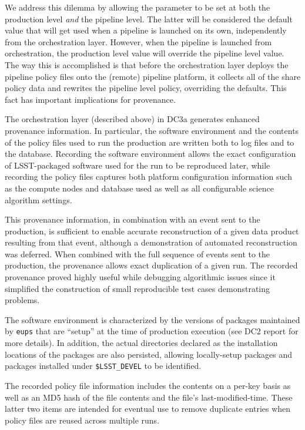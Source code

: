 We address this dilemma by allowing the parameter to be set at both
the production level {\it and} the pipeline level.  The latter will be
considered the default value that will get used when a pipeline is
launched on its own, independently from the orchestration layer.
However, when the pipeline is launched from orchestration, the
production level value will override the pipeline level value.  The
way this is accomplished is that before the orchestration layer
deploys the pipeline policy files onto the (remote) pipeline platform,
it collects all of the share policy data and rewrites the pipeline
level policy, overriding the defaults.  This fact has important
implications for provenance.  



The orchestration layer (described above) in DC3a generates enhanced
provenance information.  In particular, the software environment and
the contents of the policy files used to run the production are
written both to log files and to the database.  Recording the software
environment allows the exact configuration of LSST-packaged software
used for the run to be reproduced later, while recording the policy
files captures both platform configuration information such as the
compute nodes and database used as well as all configurable science
algorithm settings.

This provenance information, in combination with an event sent to the
production, is sufficient to enable accurate reconstruction of a given
data product resulting from that event, although a demonstration of
automated reconstruction was deferred.  When combined with the full
sequence of events sent to the production, the provenance allows exact
duplication of a given run.  The recorded provenance proved highly
useful while debugging algorithmic issues since it simplified the
construction of small reproducible test cases demonstrating problems.

The software environment is characterized by the versions of packages
maintained by {\tt eups} that are ``setup'' at the time of production
execution (see DC2 report for more details).  In addition, the actual
directories declared as the installation locations of the packages are
also persisted, allowing locally-setup packages and packages installed
under {\tt \$LSST\_DEVEL} to be identified.

The recorded policy file information includes the contents on a per-key
basis as well as an MD5 hash of the file contents and the file's
last-modified-time.  These latter two items are intended for eventual
use to remove duplicate entries when policy files are reused across
multiple runs.

